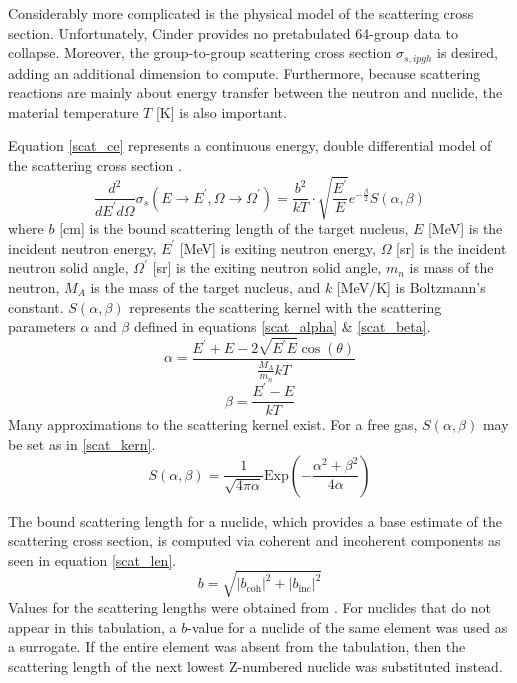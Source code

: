 Considerably more complicated is the physical model of the scattering cross section.  Unfortunately, 
Cinder provides no pretabulated 64-group data to collapse.  Moreover, the group-to-group scattering
cross section $\sigma_{s,ipgh}$ is desired, adding an additional dimension to compute.
Furthermore, because scattering reactions are mainly about energy transfer between the neutron and 
nuclide, the material temperature $T$ [K] is also important.

Equation \ref{scat_ce} represents a continuous energy, double differential model of the scattering 
cross section \cite{Yamamoto2006, Mattes2005}.
\begin{equation}
\label{scat_ce}
\frac{d^2}{dE^\prime d\Omega} \sigma_s(E\to E^\prime, \Omega\to\Omega^\prime) = \frac{b^2}{kT} \cdot 
            \sqrt{\frac{E^{\prime}}{E}} e^{-\frac{\beta}{2}} S(\alpha, \beta)
\end{equation}
where $b$ [cm] is the bound scattering length of the target nucleus, $E$ [MeV] is the incident
neutron energy, $E^\prime$ [MeV] is exiting neutron energy, $\Omega$ [sr] is the incident 
neutron solid angle, $\Omega^\prime$ [sr] is the exiting neutron solid angle,
$m_n$ is mass of the neutron, 
$M_A$ is the mass of the target nucleus, and $k$ [MeV/K] is Boltzmann's constant.  $S(\alpha, \beta)$
represents the scattering kernel with the scattering parameters $\alpha$ and $\beta$ defined in 
equations \ref{scat_alpha} \& \ref{scat_beta}.
\begin{equation}
\label{scat_alpha}
\alpha = \frac{E^\prime + E - 2\sqrt{E^\prime E}\cos(\theta)}{\frac{M_A}{m_n}kT}
\end{equation}
\begin{equation}
\label{scat_beta}
\beta = \frac{E^\prime - E}{kT}
\end{equation}
Many approximations to the scattering kernel exist.  For a free gas, $S(\alpha, \beta)$ may be set 
as in \ref{scat_kern}.
\begin{equation}
\label{scat_kern}
S(\alpha, \beta) = \frac{1}{\sqrt{4\pi\alpha}} \mbox{Exp}\left(-\frac{\alpha^2 + \beta^2}{4\alpha}\right)
\end{equation}

The bound scattering length for a nuclide, which provides a base estimate of the scattering cross section, 
is computed via coherent and incoherent components as seen in equation \ref{scat_len}.
\begin{equation}
\label{scat_len}
b = \sqrt{\left| b_{\mbox{coh}} \right|^2 + \left| b_{\mbox{inc}} \right|^2}
\end{equation}
Values for the scattering lengths were obtained from \cite{Sears1992}.  For nuclides
that do not appear in this tabulation, a $b$-value for a nuclide of the same element was
used as a surrogate.  If the entire element was absent from the tabulation, then the 
scattering length of the next lowest Z-numbered nuclide was substituted instead.

